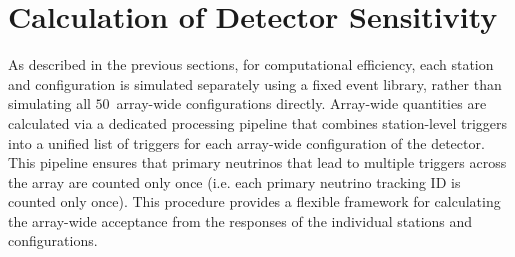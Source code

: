 \section{Calculation of Detector Sensitivity \label{sec:veffpaper_calculations}}

      As described in the previous sections, for computational efficiency, each station and configuration is simulated separately using a fixed event library, rather than simulating all $50$~array-wide configurations directly.
      Array-wide quantities are calculated via a dedicated processing pipeline that combines station-level triggers into a unified list of triggers for each array-wide configuration of the detector.
      This pipeline ensures that primary neutrinos that lead to multiple triggers across the array are counted only once (i.e.
      each primary neutrino tracking ID is counted only once).
      This procedure provides a flexible framework for calculating the array-wide acceptance from the responses of the individual stations and configurations.

